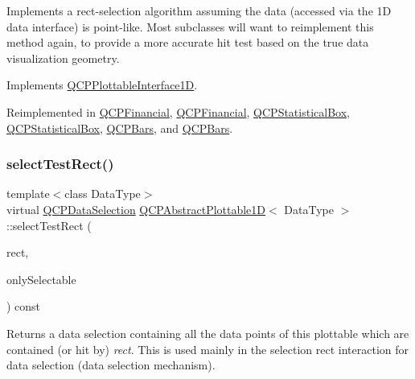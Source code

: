 Implements a rect-\/selection algorithm assuming the data (accessed via the 1D data interface) is point-\/like. Most subclasses will want to reimplement this method again, to provide a more accurate hit test based on the true data visualization geometry.

Implements \hyperlink{class_q_c_p_plottable_interface1_d_a67093e4ccf490ff5f7750640941ff34c}{Q\+C\+P\+Plottable\+Interface1D}.



Reimplemented in \hyperlink{class_q_c_p_financial_a3c5beb1ab028a1dba845fc9dcffc7cf4}{Q\+C\+P\+Financial}, \hyperlink{class_q_c_p_financial_a2d7c9beec376fed78a6091a17f59eb1e}{Q\+C\+P\+Financial}, \hyperlink{class_q_c_p_statistical_box_a42febad6ad5e924a151434cc434b4ffc}{Q\+C\+P\+Statistical\+Box}, \hyperlink{class_q_c_p_statistical_box_a7047863d59673d8d049bf26cfdd9912c}{Q\+C\+P\+Statistical\+Box}, \hyperlink{class_q_c_p_bars_ab03bb6125c3e983b89d694f75ce6b3d5}{Q\+C\+P\+Bars}, and \hyperlink{class_q_c_p_bars_a429d8c3c39972bf6069329175bb85c34}{Q\+C\+P\+Bars}.

\mbox{\label{class_q_c_p_abstract_plottable1_d_a51624b702b6f9e50d83e759986c2b39a}} 
\subsubsection{\texorpdfstring{select\+Test\+Rect()}{selectTestRect()}\hspace{0.1cm}{\footnotesize\ttfamily [2/2]}}
{\footnotesize\ttfamily template$<$class Data\+Type$>$ \\
virtual \hyperlink{class_q_c_p_data_selection}{Q\+C\+P\+Data\+Selection} \hyperlink{class_q_c_p_abstract_plottable1_d}{Q\+C\+P\+Abstract\+Plottable1D}$<$ Data\+Type $>$\+::select\+Test\+Rect (\begin{DoxyParamCaption}\item[{const Q\+RectF \&}]{rect,  }\item[{bool}]{only\+Selectable }\end{DoxyParamCaption}) const\hspace{0.3cm}{\ttfamily [virtual]}}

Returns a data selection containing all the data points of this plottable which are contained (or hit by) {\itshape rect}. This is used mainly in the selection rect interaction for data selection (data selection mechanism).

